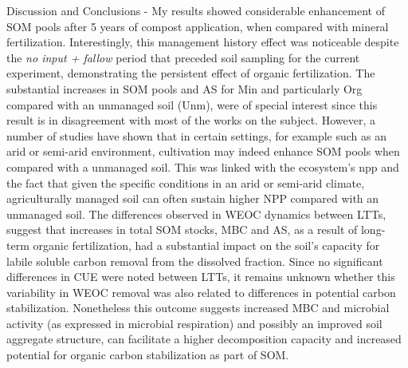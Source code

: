	Discussion and Conclusions - My results showed considerable enhancement of SOM pools after 5 years of compost application, when compared with mineral fertilization. Interestingly, this management history effect was noticeable despite the \textit{no input + fallow} period that preceded soil sampling for the current experiment, demonstrating the persistent effect of organic fertilization. The substantial increases in SOM pools and AS for Min and particularly Org compared with an unmanaged soil (Unm), were of special interest since this result is in disagreement with most of the works on the subject. However, a number of studies have shown that in certain settings, for example such as an arid or semi-arid environment, cultivation may indeed enhance SOM pools when compared with a unmanaged soil. This was linked with the ecosystem's \gls{npp} and the fact that given the specific conditions in an arid or semi-arid climate, agriculturally managed soil can often sustain higher NPP compared with an unmanaged soil.
	The differences observed in WEOC dynamics between LTTs, suggest that increases in total SOM stocks, MBC and AS, as a result of long-term organic fertilization, had a substantial impact on the soil's capacity for labile soluble carbon removal from the dissolved fraction. Since no significant differences in CUE were noted between LTTs, it remains unknown whether this variability in WEOC removal was also related to differences in potential carbon stabilization. Nonetheless this outcome suggests increased MBC and microbial activity (as expressed in microbial respiration) and possibly an improved soil aggregate structure, can facilitate a higher decomposition capacity and increased potential for organic carbon stabilization as part of SOM.

